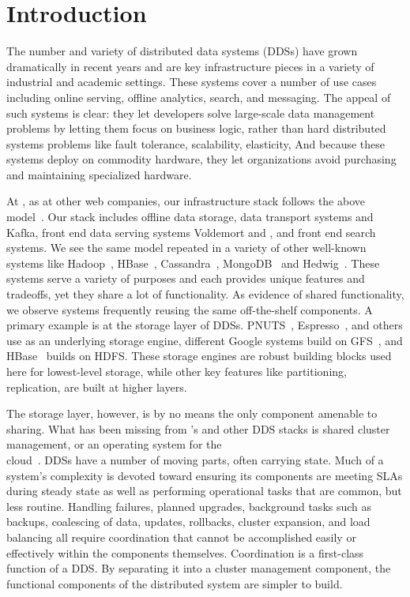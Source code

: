 \section{Introduction}
\label{sec:intro}
%
The number and variety of distributed data systems (DDSs) have grown
dramatically in recent years and are key infrastructure pieces in a variety of
industrial and academic settings.    
These systems cover a number of use cases including online serving,
offline analytics, search, and messaging.  The 
appeal of such systems is clear: they let developers solve large-scale data 
management problems by letting them focus on business logic, rather than hard distributed systems problems
like fault tolerance, scalability, elasticity, \etc   And because these systems
deploy on commodity hardware, they let organizations avoid purchasing and
maintaining specialized hardware. 
 
At \linkedin, as at other web companies, our infrastructure stack follows the
above model~\cite{linkedin12}.  Our stack includes offline data storage, data
transport systems \databus and Kafka, front end data serving systems Voldemort
and \ES, and front end search systems.  We see the same model repeated in a
variety of other well-known systems like
Hadoop~\cite{hadoop}, HBase~\cite{hbase}, Cassandra~\cite{cassandra},
MongoDB~\cite{mongodb} and Hedwig~\cite{hedwig}.  
These systems serve a variety of purposes and each provides unique features and tradeoffs, yet 
they share a lot of functionality.  As evidence of shared functionality, we
observe systems frequently reusing the same off-the-shelf components.  A primary
example is at the storage layer of DDSs.
PNUTS~\cite{cooper08}, Espresso~\cite{linkedin12}, and others use \mysql 
as an underlying storage engine, different Google systems build on
GFS~\cite{chang06, shute12}, and HBase~\cite{hbase} builds on HDFS.  These storage
engines are robust building blocks used here for lowest-level storage, while
other key features like partitioning, replication, \etc are built at higher layers.  

The storage layer, however, is by no means the only component amenable to
sharing.  What has been missing from \linkedin's and other DDS stacks is shared
cluster management, or an operating system for the 
\\ cloud~\cite{zaharia11}.
DDSs have a number of moving parts, often carrying state.  Much of a system's complexity is devoted toward
 ensuring its components are meeting SLAs
 during steady state as well as performing operational tasks that are common, but less routine. 
Handling failures, planned upgrades, background tasks such as backups,
coalescing of data, updates, rollbacks, cluster expansion, and load balancing all require coordination
that cannot be accomplished easily or effectively within the components themselves. 
Coordination is a first-class function of a DDS.  By separating it into a cluster management component, 
the functional components of the distributed system are simpler to build.  

